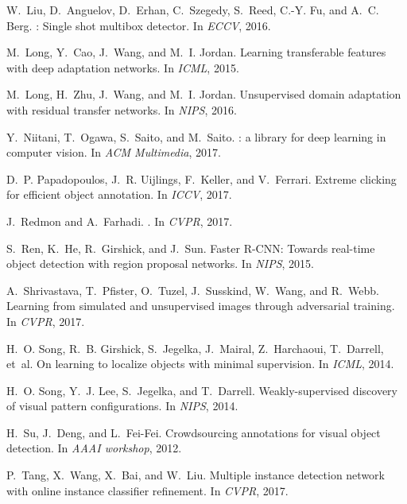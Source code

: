 \documentclass[10pt,twocolumn,letterpaper]{article}
\begin{document}
{\begin{thebibliography}{10}
W.~Liu, D.~Anguelov, D.~Erhan, C.~Szegedy, S.~Reed, C.-Y. Fu, and A.~C. Berg.
: Single shot multibox detector.
\newblock In {\em ECCV}, 2016.

M.~Long, Y.~Cao, J.~Wang, and M.~I. Jordan.
\newblock Learning transferable features with deep adaptation networks.
\newblock In {\em ICML}, 2015.

M.~Long, H.~Zhu, J.~Wang, and M.~I. Jordan.
\newblock Unsupervised domain adaptation with residual transfer networks.
\newblock In {\em NIPS}, 2016.

Y.~Niitani, T.~Ogawa, S.~Saito, and M.~Saito.
: a library for deep learning in computer vision.
\newblock In {\em ACM Multimedia}, 2017.

D.~P. Papadopoulos, J.~R. Uijlings, F.~Keller, and V.~Ferrari.
\newblock Extreme clicking for efficient object annotation.
\newblock In {\em ICCV}, 2017.

J.~Redmon and A.~Farhadi.
.
\newblock In {\em CVPR}, 2017.

S.~Ren, K.~He, R.~Girshick, and J.~Sun.
\newblock Faster {R-CNN}: Towards real-time object detection with region
  proposal networks.
\newblock In {\em NIPS}, 2015.

A.~Shrivastava, T.~Pfister, O.~Tuzel, J.~Susskind, W.~Wang, and R.~Webb.
\newblock Learning from simulated and unsupervised images through adversarial
  training.
\newblock In {\em CVPR}, 2017.

H.~O. Song, R.~B. Girshick, S.~Jegelka, J.~Mairal, Z.~Harchaoui, T.~Darrell,
  et~al.
\newblock On learning to localize objects with minimal supervision.
\newblock In {\em ICML}, 2014.

H.~O. Song, Y.~J. Lee, S.~Jegelka, and T.~Darrell.
\newblock Weakly-supervised discovery of visual pattern configurations.
\newblock In {\em NIPS}, 2014.

H.~Su, J.~Deng, and L.~Fei-Fei.
\newblock Crowdsourcing annotations for visual object detection.
\newblock In {\em AAAI workshop}, 2012.

P.~Tang, X.~Wang, X.~Bai, and W.~Liu.
\newblock Multiple instance detection network with online instance classifier
  refinement.
\newblock In {\em CVPR}, 2017.


\end{thebibliography}}
\end{document}
